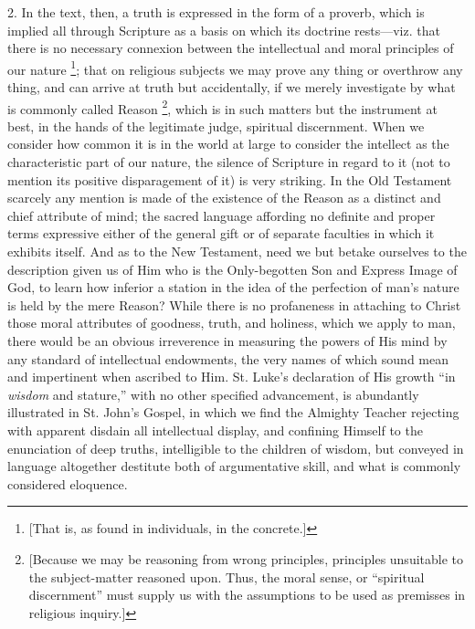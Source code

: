2. In the text, then, a truth is expressed in the form of a
proverb, which is implied all through Scripture as a basis on which
its doctrine rests—viz. that there is no necessary connexion between
the intellectual and moral principles of our nature \footnote{[That is, as
found in individuals, in the concrete.]}; that on religious subjects we may prove any thing or overthrow
any thing, and can arrive at truth but accidentally, if we merely
investigate by what is commonly called Reason \footnote{[Because we may
be reasoning from wrong principles, principles unsuitable to the
subject-matter reasoned upon. Thus, the moral sense, or
``spiritual discernment'' must supply us with the assumptions
to be used as premisses in religious inquiry.]}, which is in such matters but the instrument at best, in the
hands of the legitimate judge, spiritual discernment. When we consider
how common it is in the world at large to consider the intellect as
the characteristic part of our nature, the silence of Scripture in
regard to it (not to mention its positive disparagement of it) is very
striking. In the Old Testament scarcely any mention is made of the
existence of the Reason as a distinct and chief attribute of mind; the
sacred language affording no definite and proper terms expressive
either of the general gift or of separate faculties in which it
exhibits itself. And as to the New Testament, need we but betake
ourselves to the description given us of Him who is the Only-begotten
Son and Express Image of God, to learn how inferior a station in the
idea of the perfection of man's nature is held by the mere Reason?
While there is no profaneness in attaching to Christ those moral
attributes of goodness, truth, and holiness, which we apply to man,
there would be an obvious irreverence in measuring the powers of His
mind by any standard of intellectual endowments, the very names of
which sound mean and impertinent when ascribed to Him. St. Luke's
declaration of His growth ``in \emph{wisdom} and stature,''
with no other specified advancement, is abundantly illustrated in St.
John's Gospel, in which we find the Almighty Teacher rejecting with
apparent disdain all intellectual display, and confining Himself to
the enunciation of deep truths, intelligible to the children of
wisdom, but conveyed in language altogether destitute both of
argumentative skill, and what is commonly considered eloquence.

